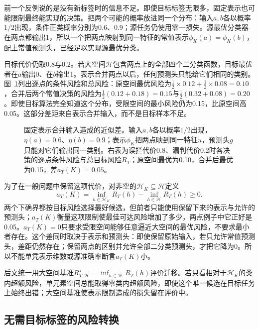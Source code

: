 前一个反例说的是没有新标签时的信息不足。即使目标标签无限多，固定表示也可能限制最终能实现的决策。把两个可能的概率放进同一个分布：输入$a,b$各以概率$1/2$出现，条件正类概率分别为0.6、0.9；源任务仍使用零一损失。源最优分类器在两点都输出1，所以一个把两点映射到同一特征的常值表示$\phi_K(a)=\phi_K(b)$，配上常值预测头，已经足以实现源最优分类。

目标代价仍取0.8与0.2。若大空间$\mathcal H$包含两点上的全部四个二分类函数，目标最优者在$a$输出0、在$b$输出1。表示合并两点以后，任何预测头只能给它们相同的类别。图~\ref{fig:lt9-representation-merge}列出逐点的条件风险和总风险：原空间最优风险为$\tfrac12\times0.12+\tfrac12\times0.08=0.10$，合并后两个常值决策的风险为$\tfrac12(0.12+0.18)=0.15$与$\tfrac12(0.32+0.08)=0.20$。即使目标算法完全知道这个分布，受限空间的最小风险仍为0.15，比原空间高0.05。这部分差距来自表示合并输入，而不是目标样本不足。

\begin{figure}[htbp]
 \centering
 
 \caption{固定表示合并输入造成的近似差。输入$a,b$各以概率$1/2$出现，$\eta(a)=0.6$、$\eta(b)=0.9$；表示$\phi_K$把两点映到同一特征$u$，预测头$g$只能对它们输出同一类别。右表为误拦代价0.8、漏判代价0.2时各决策的逐点条件风险与总目标风险$R_T$；原空间最优为0.10，合并后最优为0.15，差$a_T(K)=0.05$。}
 \label{fig:lt9-representation-merge}
\end{figure}

为了在一般问题中保留这项代价，对非空的$\mathcal H_K\subseteq\mathcal H$定义
\begin{equation}
 a_T(K)=\inf_{h\in\mathcal H_K}R_T(h)
        -\inf_{h\in\mathcal H}R_T(h)\geq0 .
 \label{eq:task-transfer-bias}
\end{equation}
两个下确界都按目标风险选择最好候选，但前者只能使用保留下来的表示与允许的预测头；$a_T(K)$衡量这项限制使最佳可达风险增加了多少，两点例子中它正好是0.05。$a_T(K)=0$只要求受限空间能够任意逼近大空间的最优风险，不要求最小者存在。这个差同时取决于表示和预测头：即使保留原始输入，若只允许常值预测头，差距仍然存在；保留两点的区别并允许全部二分类预测头，才把它降为0。所以不能单凭表示维数或源准确率断言$a_T(K)$小。

后文统一用大空间基准$R_{T,\mathcal H}^{\star}=\inf_{h\in\mathcal H}R_T(h)$评价迁移。若只看相对于$\mathcal H_K$的类内超额风险，单元素空间总能取得零类内超额风险，即使这个唯一候选在目标任务上始终出错；大空间基准使表示限制造成的损失留在评价中。
\subsection{无需目标标签的风险转换}
\label{sec:task-risk-transfer}

